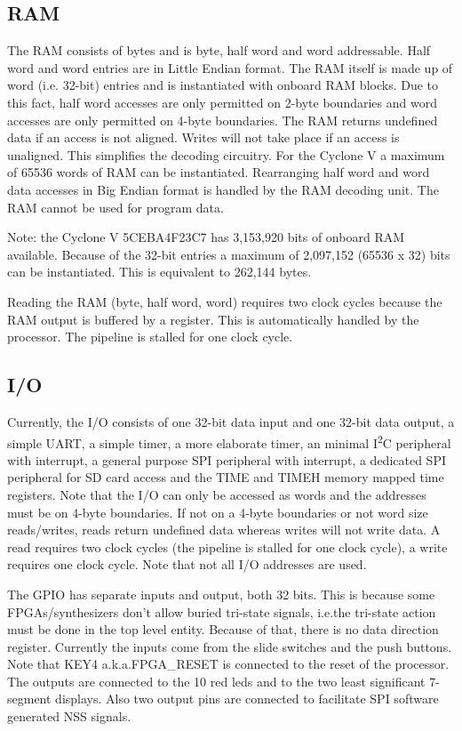 \documentclass[12pt]{article}
\begin{document}
\subsection{RAM}
\label{sec:ram}
The RAM consists of bytes and is byte, half word and word addressable. Half word and word entries are in Little Endian format. The RAM itself is made up of word (i.e. 32-bit) entries and is instantiated with onboard RAM blocks. Due to this fact, half word accesses are only permitted on 2-byte boundaries and word accesses are only permitted on 4-byte boundaries. The RAM returns undefined data if an access is not aligned. Writes will not take place if an access is unaligned. This simplifies the decoding circuitry. For the Cyclone V a maximum of 65536 words of RAM can be instantiated. Rearranging half word and word data accesses in Big Endian format is handled by the RAM decoding unit. The RAM cannot be used for program data.

Note: the Cyclone V 5CEBA4F23C7 has 3,153,920 bits of onboard RAM available. Because of the 32-bit entries a maximum of 2,097,152 (65536 x 32) bits can be instantiated. This is equivalent to 262,144 bytes.

Reading the RAM (byte, half word, word) requires two clock cycles because the RAM output is buffered by a register. This is automatically handled by the processor. The pipeline is stalled for one clock cycle.

\subsection{I/O}
\label{sec/io}
Currently, the I/O consists of one 32-bit data input and one 32-bit data output, a simple UART, a simple timer, a more elaborate timer, an minimal I\textsuperscript{2}C peripheral with interrupt, a general purpose SPI peripheral with interrupt, a dedicated SPI peripheral for SD card access and the TIME and TIMEH memory mapped time registers. Note that the I/O can only be accessed as words and the addresses must be on 4-byte boundaries. If not on a 4-byte boundaries or not word size reads/writes, reads return undefined data whereas writes will not write data. A read requires two clock cycles (the pipeline is stalled for one clock cycle), a write requires one clock cycle. Note that not all I/O addresses are used.

The GPIO has separate inputs and output, both 32 bits. This is because some FPGAs/synthesizers don't allow buried tri-state signals, i.e.\@ the tri-state action must be done in the top level entity. Because of that, there is no data direction register. Currently the inputs come from the slide switches and the push buttons. Note that KEY4 a.k.a.\@ FPGA\_RESET is connected to the reset of the processor. The outputs are connected to the 10 red leds and to the two least significant 7-segment displays. Also two output pins are connected to facilitate SPI software generated NSS signals.
\end{document}
